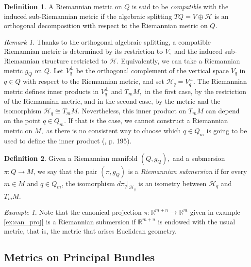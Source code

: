 \documentclass[12pt, letterpaper, reqno]{amsart}
\theoremstyle{definition}
\newtheorem{df}{Definition}
\theoremstyle{plain}
\theoremstyle{remark}
\newtheorem{ex}{Example}
\newtheorem{rem}{Remark}
\begin{document}
\begin{df}\label{df:compatible}
	A Riemannian metric on $ Q $ is said to be \textit{compatible} with the induced sub-Riemannian metric if the algebraic splitting $ TQ = V \oplus \mathcal{H} $ is an orthogonal decomposition with respect to the Riemannian metric on $ Q$.  
\end{df}

\begin{rem}
Thanks to the orthogonal algebraic splitting, a compatible Riemannian metric is determined by its restriction to $ V, $ and the induced sub-Riemannian structure restricted to $ \mathcal{H} $. Equivalently, we can take a Riemannian metric $ g_Q $ on $ Q. $ Let $ V_q^\perp $ be the orthogonal complement of the vertical space $ V_q $ in $ q\in Q $ with respect to the Riemannian metric, and set $ \mathcal{H}_q=V_q^\perp. $ The Riemannian metric defines inner products in $ V_q^\perp $  and $ T_mM, $ in the first case, by the restriction of the Riemannian metric, and in the second case, by the metric and the isomorphism $ \mathcal{H}_q\cong T_mM. $ Nevertheless, this inner product on $ T_mM $ can depend on the point $ q\in Q_m $. If that is the case, we cannot construct a Riemannian metric on $ M, $ as there is no consistent way to choose which $ q\in Q_m $ is going to be used to define the inner product (\cite{montgomery2002tour}, p. 195).
\end{rem}

\begin{df}\label{def:riemannian_submersion}
	Given a Riemannian manifold $ (Q, g_Q),$ and a submersion $ \pi: Q \rightarrow {M}
	$, we say that the pair $ (\pi, g_Q) $ is a \textit{Riemannian submersion} if for every $ m\in M $ and $ q\in Q_m $,  the isomorphism $ d\pi_q |_{\mathcal{H}_q} $ is an isometry between $ \mathcal{H}_q $ and $ T_m M$. 
\end{df}
\begin{ex}
	Note that the canonical projection $ \pi : \mathbb{R}^{m+n} \rightarrow \mathbb{R}^m $ given in example \ref{ex:can_proj} is a Riemannian submersion if $ \mathbb{R}^{m+n} $ is endowed with the usual metric, that is, the metric that arises Euclidean geometry.
\end{ex}
\subsection{Metrics on Principal Bundles}%
\label{sub:metrics_on_principal_bundles}
\end{document}
